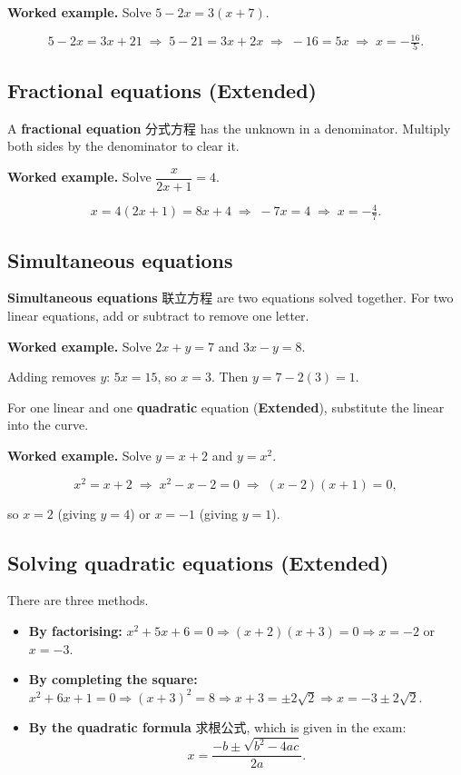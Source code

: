 \documentclass[11pt]{article}
\begin{document}
\textbf{Worked example.} Solve $5 - 2x = 3(x + 7)$.

\[
5 - 2x = 3x + 21 \;\Rightarrow\; 5 - 21 = 3x + 2x \;\Rightarrow\; -16 = 5x \;\Rightarrow\; x = -\tfrac{16}{5}.
\]

\subsection*{Fractional equations (Extended)}

A \textbf{fractional equation} 分式方程 has the unknown in a denominator. Multiply both sides by the denominator to clear it.

\textbf{Worked example.} Solve $\dfrac{x}{2x + 1} = 4$.

\[
x = 4(2x + 1) = 8x + 4 \;\Rightarrow\; -7x = 4 \;\Rightarrow\; x = -\tfrac{4}{7}.
\]

\subsection*{Simultaneous equations}

\textbf{Simultaneous equations} 联立方程 are two equations solved together. For two linear equations, add or subtract to remove one letter.

\textbf{Worked example.} Solve $2x + y = 7$ and $3x - y = 8$.

Adding removes $y$: $5x = 15$, so $x = 3$. Then $y = 7 - 2(3) = 1$.

For one linear and one \textbf{quadratic} equation (\textbf{Extended}), substitute the linear into the curve.

\textbf{Worked example.} Solve $y = x + 2$ and $y = x^{2}$.

\[
x^{2} = x + 2 \;\Rightarrow\; x^{2} - x - 2 = 0 \;\Rightarrow\; (x - 2)(x + 1) = 0,
\]

so $x = 2$ (giving $y = 4$) or $x = -1$ (giving $y = 1$).

\subsection*{Solving quadratic equations (Extended)}

There are three methods.

\begin{itemize}
\item \textbf{By factorising:} $x^{2} + 5x + 6 = 0 \Rightarrow (x + 2)(x + 3) = 0 \Rightarrow x = -2$ or $x = -3$.

\item \textbf{By completing the square:} $x^{2} + 6x + 1 = 0 \Rightarrow (x + 3)^{2} = 8 \Rightarrow x + 3 = \pm 2\sqrt{2} \Rightarrow x = -3 \pm 2\sqrt{2}$.

\item \textbf{By the quadratic formula} 求根公式, which is given in the exam: \[x = \frac{-b \pm \sqrt{b^{2} - 4ac}}{2a}.\]

\end{itemize}
\end{document}
